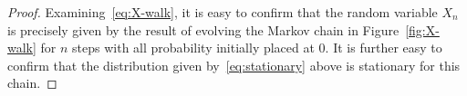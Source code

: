   \begin{proof}  
   
    Examining~\eqref{eq:X-walk}, it is easy to confirm that 
    the random variable $X_n$ is precisely given by 
    the result of evolving the Markov chain in Figure~\ref{fig:X-walk} for $n$ steps 
    with all probability initially placed at 0. 
    It is further easy to confirm that the distribution given by~\eqref{eq:stationary} above is stationary for this chain.




\end{proof}
